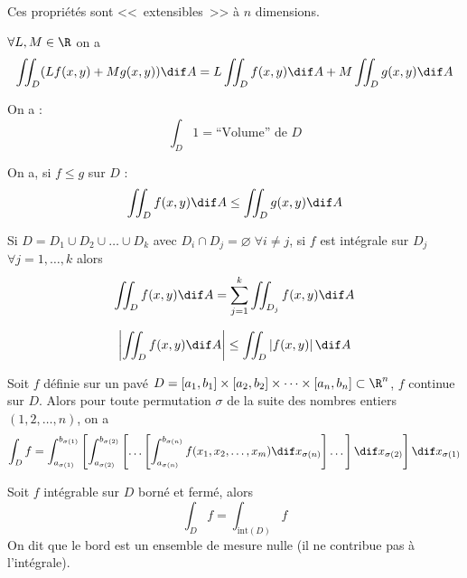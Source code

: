 \begin{myrem}
	Ces propriétés sont <<~extensibles~>> à $n$ dimensions.
\end{myrem}

\begin{myprop}
	$\forall L, M \in \R$ on a
	\[ \iint_D (L f(x,y) + M g(x,y)) \dif A = L \iint_D f(x,y) \dif A + M \iint_D g(x,y) \dif A \]
\end{myprop}

\begin{myprop} On a :
	\[ \int_D 1 = \text{``Volume'' de } D\]
\end{myprop}

\begin{myprop} On a, si $f \leq g$ sur $D$ :
	\[ \iint_D f(x,y) \dif A \leq \iint_D g(x,y) \dif A \]
\end{myprop}

\begin{myprop}
	Si $D = D_1 \cup D_2 \cup \dots \cup D_k$ avec $D_i \cap D_j = \varnothing \; \forall i \neq j$, si $f$ est intégrale sur $D_j$ $\forall j = 1, \dots, k$ alors
	\[ \iint_D f(x,y) \dif A = \sum_{j=1}^k \iint_{D_j} f(x,y) \dif A \]
\end{myprop}

\begin{myprop}
	\[ \left| \iint_D f(x,y) \dif A \right| \leq \iint_D \left| f(x,y) \right| \dif A \]
\end{myprop}

\begin{mytheo} Soit $f$ définie sur un pavé $D = [a_1,b_1] \times [a_2,b_2] \times \cdots \times [a_n,b_n] \subset \R^n$, $f$ continue sur $D$. Alors pour toute permutation $\sigma$ de la suite des nombres entiers $(1,2,\dots, n)$, on a
	\[ \int_D f = \int_{a_{\sigma(1)}}^{b_{\sigma(1)}} \left[ \int_{a_{\sigma(2)}}^{b_{\sigma(2)}}   \left[ \dots \left[ \int_{a_{\sigma(n)}}^{b_{\sigma(n)}} f(x_1,x_2,\dots,x_m) \dif x_{\sigma(n)} \right]   \dots \right] \dif x_{\sigma(2)} \right] \dif x_{\sigma(1)} \]
\end{mytheo}

\begin{mytheo} Soit $f$ intégrable sur $D$ borné et fermé, alors
\[ \int_D f = \int_{\text{int}(D)} f\]
On dit que le bord est un ensemble de mesure nulle (il ne contribue pas à l'intégrale).
\end{mytheo}

